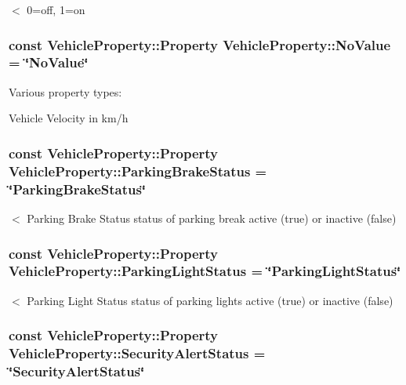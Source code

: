 $<$ 0=off, 1=on \hypertarget{classVehicleProperty_ae013e9c1f3fb57d646211d3e6bb4ca9e}{
\subsubsection[{No\-Value}]{\setlength{\rightskip}{0pt plus 5cm}const Vehicle\-Property\-::\-Property Vehicle\-Property\-::\-No\-Value = \char`\"{}No\-Value\char`\"{}\hspace{0.3cm}{\ttfamily [static]}}}\label{classVehicleProperty_ae013e9c1f3fb57d646211d3e6bb4ca9e}


Various property types\-: 

Vehicle Velocity in km/h \hypertarget{classVehicleProperty_a848ad7334c7aa14709fe2e8c3a1b2608}{
\subsubsection[{Parking\-Brake\-Status}]{\setlength{\rightskip}{0pt plus 5cm}const Vehicle\-Property\-::\-Property Vehicle\-Property\-::\-Parking\-Brake\-Status = \char`\"{}Parking\-Brake\-Status\char`\"{}\hspace{0.3cm}{\ttfamily [static]}}}\label{classVehicleProperty_a848ad7334c7aa14709fe2e8c3a1b2608}
$<$ Parking Brake Status status of parking break active (true) or inactive (false) \hypertarget{classVehicleProperty_a505ffc37974f674df55a97c27a7ba0b7}{
\subsubsection[{Parking\-Light\-Status}]{\setlength{\rightskip}{0pt plus 5cm}const Vehicle\-Property\-::\-Property Vehicle\-Property\-::\-Parking\-Light\-Status = \char`\"{}Parking\-Light\-Status\char`\"{}\hspace{0.3cm}{\ttfamily [static]}}}\label{classVehicleProperty_a505ffc37974f674df55a97c27a7ba0b7}
$<$ Parking Light Status status of parking lights active (true) or inactive (false) \hypertarget{classVehicleProperty_a7bc28af663879a2ac9145e5b97a5da4f}{
\subsubsection[{Security\-Alert\-Status}]{\setlength{\rightskip}{0pt plus 5cm}const Vehicle\-Property\-::\-Property Vehicle\-Property\-::\-Security\-Alert\-Status = \char`\"{}Security\-Alert\-Status\char`\"{}\hspace{0.3cm}{\ttfamily [static]}}}\label{classVehicleProperty_a7bc28af663879a2ac9145e5b97a5da4f}
